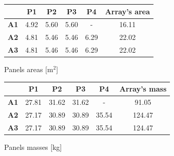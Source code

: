 \begin{minipage}{0.5\linewidth}
    \centering
    \small
    \captionsetup{type=table}
    \renewcommand{\arraystretch}{1.4}
    \begin{tabular}{|c|c|c|c|c|c|}
        \hline
        &  \textbf{P1}  & \textbf{P2} & \textbf{P3} & \textbf{P4} & \textbf{Array's area} \\
        \hline
        \hline
        \textbf{A1}      & 4.92 & 5.60 & 5.60 & - & 16.11  \\
        \hline
        \textbf{A2}      & 4.81 & 5.46 & 5.46 & 6.29 & 22.02 \\
        \hline
        \textbf{A3}     & 4.81 & 5.46 & 5.46 & 6.29 &  22.02 \\
        \hline
    \end{tabular}
    \caption{Panels areas [m$^2$]}
    \label{table:panels_area}

    \vspace*{5mm}

    \begin{tabular}{|c|c|c|c|c|c|}
        \hline
        &  \textbf{P1}  & \textbf{P2} & \textbf{P3} & \textbf{P4} & \textbf{Array's mass}\\
        \hline
        \hline
        \textbf{A1}      & 27.81 & 31.62 & 31.62& - & 91.05 \\
        \hline
        \textbf{A2}      & 27.17 & 30.89 & 30.89 & 35.54 & 124.47 \\
        \hline
        \textbf{A3}     & 27.17 & 30.89 & 30.89 & 35.54 & 124.47 \\
        \hline
    \end{tabular}
    \caption{Panels masses [kg]}
    \label{table:panels_mass}
\end{minipage}


